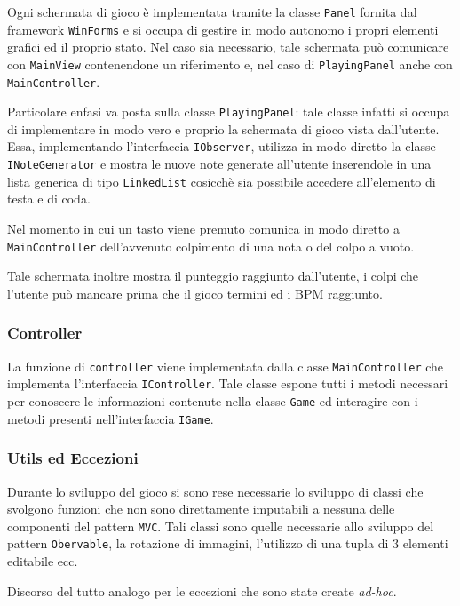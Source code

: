 Ogni schermata di gioco è implementata tramite la classe \texttt{Panel} fornita dal framework \texttt{WinForms} e si occupa di gestire in modo autonomo i propri elementi grafici ed il proprio stato.
Nel caso sia necessario, tale schermata può comunicare con \texttt{MainView} contenendone un riferimento e, nel caso di \texttt{PlayingPanel} anche con \texttt{MainController}.

\vspace{0.5cm}
Particolare enfasi va posta sulla classe \texttt{PlayingPanel}: tale classe infatti si 
occupa di implementare in modo vero e proprio la schermata di gioco vista dall'utente.
Essa, implementando l'interfaccia \texttt{IObserver}, utilizza in modo diretto la classe \texttt{INoteGenerator} e mostra le nuove note generate all'utente inserendole in una lista generica di tipo \texttt{LinkedList} cosicchè sia possibile accedere all'elemento di testa e di coda.

Nel momento in cui un tasto viene premuto comunica in modo diretto a \texttt{MainController} dell'avvenuto colpimento di una nota o del colpo a vuoto.

Tale schermata inoltre mostra il punteggio raggiunto dall'utente, i colpi che l'utente può mancare prima che il gioco termini ed i BPM raggiunto.

\subsubsection{Controller}
La funzione di \texttt{controller} viene implementata dalla classe \texttt{MainController} che implementa l'interfaccia \texttt{IController}.
Tale classe espone tutti i metodi necessari per conoscere le informazioni contenute nella classe \texttt{Game} ed interagire con i metodi presenti nell'interfaccia \texttt{IGame}.

\newpage
\subsubsection{Utils ed Eccezioni}
Durante lo sviluppo del gioco si sono rese necessarie lo sviluppo di classi che svolgono funzioni che non sono direttamente imputabili a nessuna delle componenti del pattern \texttt{MVC}.
Tali classi sono quelle necessarie allo sviluppo del pattern \texttt{Obervable}, la rotazione di immagini, l'utilizzo di una tupla di 3 elementi editabile ecc.

Discorso del tutto analogo per le eccezioni che sono state create \emph{ad-hoc}.

